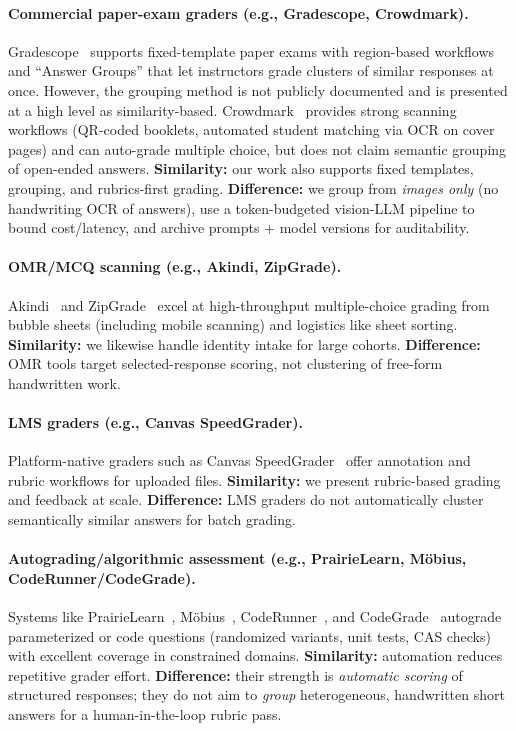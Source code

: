 \documentclass[ms,twoside,print]{nuthesis}
\newcommand{\Brand}[1]{\mbox{#1}}  %
\begin{document}
\paragraph{Commercial paper-exam graders (e.g., \Brand{Gradescope}, \Brand{Crowdmark}).}
\Brand{Gradescope}~\cite{gradescope} supports fixed-template paper exams with region-based workflows and
\enquote{Answer Groups} that let instructors grade clusters of similar responses at once. However, the
grouping method is not publicly documented and is presented at a high level as similarity-based.
\Brand{Crowdmark}~\cite{crowdmark} provides strong scanning workflows (QR-coded booklets, automated
student matching via OCR on cover pages) and can auto-grade multiple choice, but does not claim
semantic grouping of open-ended answers. \textbf{Similarity:} our work also supports fixed templates,
grouping, and rubrics-first grading. \textbf{Difference:} we group from \emph{images only} (no handwriting
OCR of answers), use a token-budgeted vision-LLM pipeline to bound cost/latency, and archive
prompts + model versions for auditability.

\paragraph{OMR/MCQ scanning (e.g., \Brand{Akindi}, \Brand{ZipGrade}).}
\Brand{Akindi}~\cite{akindi} and \Brand{ZipGrade}~\cite{zipgrade} excel at high-throughput multiple-choice grading from
bubble sheets (including mobile scanning) and logistics like sheet sorting. \textbf{Similarity:} we likewise
handle identity intake for large cohorts. \textbf{Difference:} OMR tools target selected-response scoring,
not clustering of free-form handwritten work.

\paragraph{LMS graders (e.g., \Brand{Canvas} SpeedGrader).}
Platform-native graders such as \Brand{Canvas} SpeedGrader~\cite{canvas-speedgrader} offer annotation and rubric
workflows for uploaded files. \textbf{Similarity:} we present rubric-based grading and feedback at scale.
\textbf{Difference:} LMS graders do not automatically cluster semantically similar answers for batch grading.

\paragraph{Autograding/algorithmic assessment (e.g., \Brand{PrairieLearn}, \Brand{M{\"o}bius}, \Brand{CodeRunner}/\Brand{CodeGrade}).}
Systems like \Brand{PrairieLearn}~\cite{prairielearn}, \Brand{M{\"o}bius}~\cite{mobius}, \Brand{CodeRunner}~\cite{coderunner}, and
\Brand{CodeGrade}~\cite{codegrade} autograde parameterized or code questions (randomized variants, unit tests,
CAS checks) with excellent coverage in constrained domains. \textbf{Similarity:} automation reduces
repetitive grader effort. \textbf{Difference:} their strength is \emph{automatic scoring} of structured
responses; they do not aim to \emph{group} heterogeneous, handwritten short answers for a human-in-the-loop
rubric pass.
\end{document}
